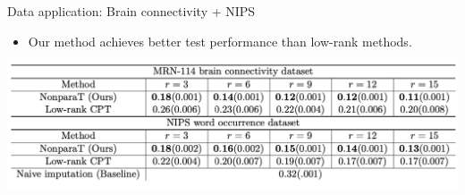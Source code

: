 \documentclass[10pt, mathserif]{beamer} %
\theoremstyle{definition}
\theoremstyle{plain}
\begin{document}
\begin{frame}{Data application: Brain connectivity + NIPS}
\begin{itemize}
\item Our method achieves better test performance than low-rank methods. 
\end{itemize}
      \begin{center}
     \begin{table}
    \includegraphics[width =\textwidth]{Figures/cvtable.pdf}
    \caption{\scriptsize MAE comparison in the brain data and NIPS data based on 5-folded cross-validations. Standard errors are reported in parenthesis.}
    \end{table}
    \end{center}
\end{frame}
\end{document}
